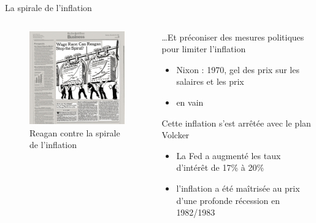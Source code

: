 \documentclass[
  ignorenonframetext,
  aspectratio=169,
]{beamer}
\providecommand{\tightlist}{%
  \setlength{\itemsep}{0pt}\setlength{\parskip}{0pt}}\usepackage{longtable,booktabs,array}
\begin{document}
\begin{frame}{La spirale de l'inflation}
\label{la-spirale-de-linflation-1}
\begin{columns}[T]
\begin{column}{0.48\textwidth}
\begin{figure}[H]

{\centering \includegraphics[width=\textwidth,height=0.8\textheight]{assets/reagan.png}

}

\caption{Reagan contre la spirale de l'inflation}

\end{figure}%
\end{column}

\begin{column}{0.48\textwidth}
\ldots Et préconiser des mesures politiques pour limiter l'inflation

\begin{itemize}
\tightlist
\item
  Nixon : 1970, gel des prix sur les salaires et les prix
\item
  en vain
\end{itemize}

Cette inflation s'est arrêtée avec le plan Volcker

\begin{itemize}
\tightlist
\item
  La Fed a augmenté les taux d'intérêt de 17\% à 20\%
\item
  l'inflation a été maîtrisée au prix d'une profonde récession en
  1982/1983
\end{itemize}
\end{column}
\end{columns}
\end{frame}
\end{document}
